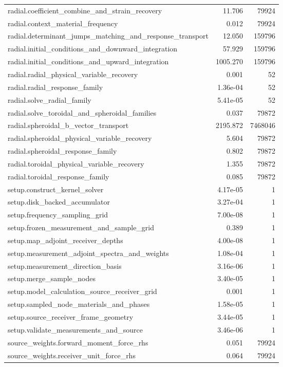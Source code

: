 \documentclass[11pt,a4paper]{article}
\begin{document}
\begin{longtable}{>{\raggedright\arraybackslash}p{12cm}rr}
radial.coefficient\_combine\_and\_strain\_recovery & 11.706 & 79924 \\
radial.context\_material\_frequency & 0.012 & 79924 \\
radial.determinant\_jumps\_matching\_and\_response\_transport & 12.050 & 159796 \\
radial.initial\_conditions\_and\_downward\_integration & 57.929 & 159796 \\
radial.initial\_conditions\_and\_upward\_integration & 1005.270 & 159796 \\
radial.radial\_physical\_variable\_recovery & 0.001 & 52 \\
radial.radial\_response\_family & 1.36e-04 & 52 \\
radial.solve\_radial\_family & 5.41e-05 & 52 \\
radial.solve\_toroidal\_and\_spheroidal\_families & 0.037 & 79872 \\
radial.spheroidal\_b\_vector\_transport & 2195.872 & 7468046 \\
radial.spheroidal\_physical\_variable\_recovery & 5.604 & 79872 \\
radial.spheroidal\_response\_family & 0.802 & 79872 \\
radial.toroidal\_physical\_variable\_recovery & 1.355 & 79872 \\
radial.toroidal\_response\_family & 0.085 & 79872 \\
setup.construct\_kernel\_solver & 4.17e-05 & 1 \\
setup.disk\_backed\_accumulator & 3.27e-04 & 1 \\
setup.frequency\_sampling\_grid & 7.00e-08 & 1 \\
setup.frozen\_measurement\_and\_sample\_grid & 0.389 & 1 \\
setup.map\_adjoint\_receiver\_depths & 4.00e-08 & 1 \\
setup.measurement\_adjoint\_spectra\_and\_weights & 1.08e-04 & 1 \\
setup.measurement\_direction\_basis & 3.16e-06 & 1 \\
setup.merge\_sample\_nodes & 3.40e-05 & 1 \\
setup.model\_calculation\_source\_receiver\_grid & 0.001 & 1 \\
setup.sampled\_node\_materials\_and\_phases & 1.58e-05 & 1 \\
setup.source\_receiver\_frame\_geometry & 3.44e-05 & 1 \\
setup.validate\_measurements\_and\_source & 3.46e-06 & 1 \\
source\_weights.forward\_moment\_force\_rhs & 0.051 & 79924 \\
source\_weights.receiver\_unit\_force\_rhs & 0.064 & 79924 \\
\bottomrule\end{longtable}\endgroup
\end{document}
